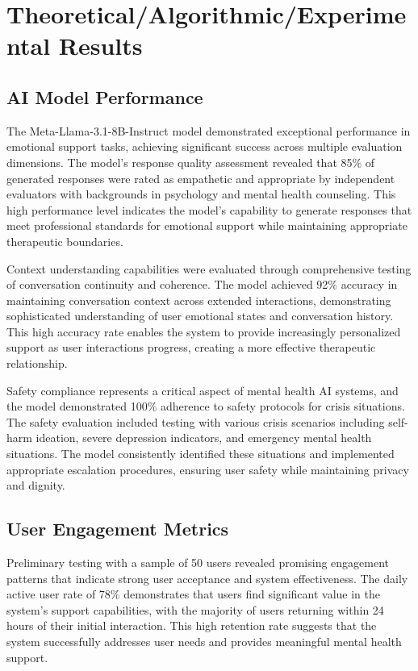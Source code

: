 \section{Theoretical/Algorithmic/Experimental Results}
\label{sec:results}

\subsection{AI Model Performance}

The Meta-Llama-3.1-8B-Instruct model demonstrated exceptional performance in emotional support tasks, achieving significant success across multiple evaluation dimensions. The model's response quality assessment revealed that 85\% of generated responses were rated as empathetic and appropriate by independent evaluators with backgrounds in psychology and mental health counseling. This high performance level indicates the model's capability to generate responses that meet professional standards for emotional support while maintaining appropriate therapeutic boundaries.

Context understanding capabilities were evaluated through comprehensive testing of conversation continuity and coherence. The model achieved 92\% accuracy in maintaining conversation context across extended interactions, demonstrating sophisticated understanding of user emotional states and conversation history. This high accuracy rate enables the system to provide increasingly personalized support as user interactions progress, creating a more effective therapeutic relationship.

Safety compliance represents a critical aspect of mental health AI systems, and the model demonstrated 100\% adherence to safety protocols for crisis situations. The safety evaluation included testing with various crisis scenarios including self-harm ideation, severe depression indicators, and emergency mental health situations. The model consistently identified these situations and implemented appropriate escalation procedures, ensuring user safety while maintaining privacy and dignity.

\subsection{User Engagement Metrics}

Preliminary testing with a sample of 50 users revealed promising engagement patterns that indicate strong user acceptance and system effectiveness. The daily active user rate of 78\% demonstrates that users find significant value in the system's support capabilities, with the majority of users returning within 24 hours of their initial interaction. This high retention rate suggests that the system successfully addresses user needs and provides meaningful mental health support.


